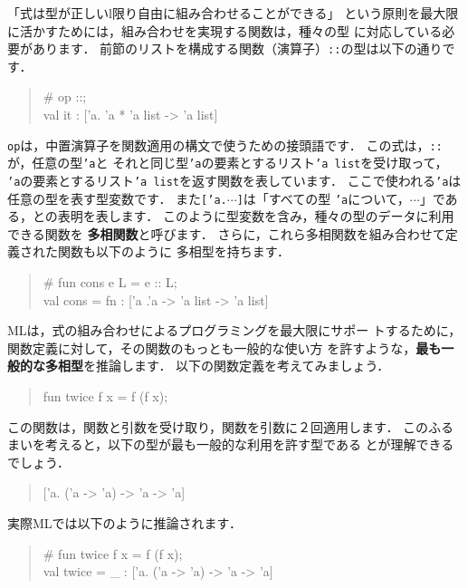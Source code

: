 \documentclass{jbook}
\begin{document}
	「式は型が正しいl限り自由に組み合わせることができる」
という原則を最大限に活かすためには，組み合わせを実現する関数は，種々の型
に対応している必要があります．
	前節のリストを構成する関数（演算子）{\tt ::}の型は以下の通りです．
\begin{tt}
\begin{quote}
\# op ::;\\
val it : ['a. 'a * 'a list -> 'a list]
\end{quote}
\end{tt}
{\tt op}は，中置演算子を関数適用の構文で使うための接頭語です．
	この式は，{\tt ::}が，任意の型{\tt 'a}と
それと同じ型{\tt 'a}の要素とするリスト{\tt 'a list}を受け取って，
{\tt 'a}の要素とするリスト{\tt 'a list}を返す関数を表しています．
	ここで使われる{\tt 'a}は任意の型を表す型変数です．
	また{\tt ['a.$\cdots$]}は「すべての型
{\tt 'a}について，$\cdots$」である，との表明を表します．
	このように型変数を含み，種々の型のデータに利用できる関数を
{\bf 多相関数}と呼びます．
	さらに，これら多相関数を組み合わせて定義された関数も以下のように
多相型を持ちます．
\begin{tt}
\begin{quote}
\# fun cons  e L  = e :: L;
\\
val cons = fn : ['a .'a  ->  'a list  -> 'a list]
\end{quote}
\end{tt}
	MLは，式の組み合わせによるプログラミングを最大限にサポー
トするために，関数定義に対して，その関数のもっとも一般的な使い方
を許すような，{\bf 最も一般的な多相型}を推論します．
	以下の関数定義を考えてみましょう．
\begin{tt}
\begin{quote}
fun twice f x = f (f x);
\end{quote}
\end{tt}
	この関数は，関数と引数を受け取り，関数を引数に２回適用します．
	このふるまいを考えると，以下の型が最も一般的な利用を許す型である
とが理解できるでしょう．
\begin{tt}
\begin{quote}
 ['a. ('a -> 'a) -> 'a -> 'a]
\end{quote}
\end{tt}
	実際MLでは以下のように推論されます．
\begin{tt}
\begin{quote}
\# fun twice f x = f (f x);
\\
val twice = \_ : ['a. ('a -> 'a) -> 'a -> 'a]
\end{quote}
\end{tt}
\end{document}
